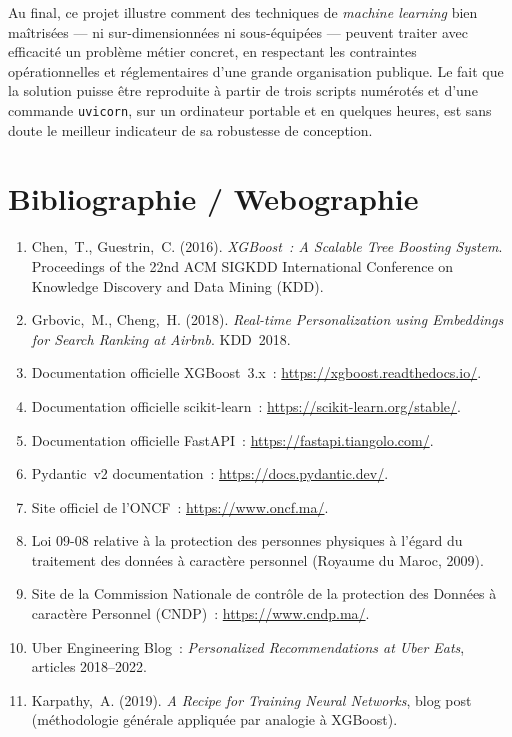 \documentclass[11pt, a4paper]{article}
\begin{document}
\bigskip

Au final, ce projet illustre comment des techniques de
\textit{machine learning} bien maîtrisées --- ni sur-dimensionnées ni
sous-équipées --- peuvent traiter avec efficacité un problème
métier concret, en respectant les contraintes opérationnelles et
réglementaires d'une grande organisation publique. Le fait que la
solution puisse être reproduite à partir de trois scripts
numérotés et d'une commande \texttt{uvicorn}, sur un ordinateur
portable et en quelques heures, est sans doute le meilleur indicateur
de sa robustesse de conception.

\newpage
\section*{Bibliographie / Webographie}

\begin{enumerate}
\item Chen,~T., Guestrin,~C. (2016). \textit{XGBoost~: A Scalable
    Tree Boosting System}. Proceedings of the 22nd ACM SIGKDD
    International Conference on Knowledge Discovery and Data Mining
    (KDD).
\item Grbovic,~M., Cheng,~H. (2018). \textit{Real-time Personalization
    using Embeddings for Search Ranking at Airbnb}. KDD~2018.
\item Documentation officielle XGBoost~3.x~:
    \url{https://xgboost.readthedocs.io/}.
\item Documentation officielle scikit-learn~:
    \url{https://scikit-learn.org/stable/}.
\item Documentation officielle FastAPI~:
    \url{https://fastapi.tiangolo.com/}.
\item Pydantic~v2 documentation~: \url{https://docs.pydantic.dev/}.
\item Site officiel de l'ONCF~: \url{https://www.oncf.ma/}.
\item Loi 09-08 relative à la protection des personnes physiques à
    l'égard du traitement des données à caractère personnel
    (Royaume du Maroc, 2009).
\item Site de la Commission Nationale de contrôle de la protection des
    Données à caractère Personnel (CNDP)~:
    \url{https://www.cndp.ma/}.
\item Uber Engineering Blog~: \textit{Personalized Recommendations at
    Uber Eats}, articles 2018--2022.
\item Karpathy,~A. (2019). \textit{A Recipe for Training Neural
    Networks}, blog post (méthodologie générale appliquée par analogie
    à XGBoost).
\end{enumerate}
\end{document}
